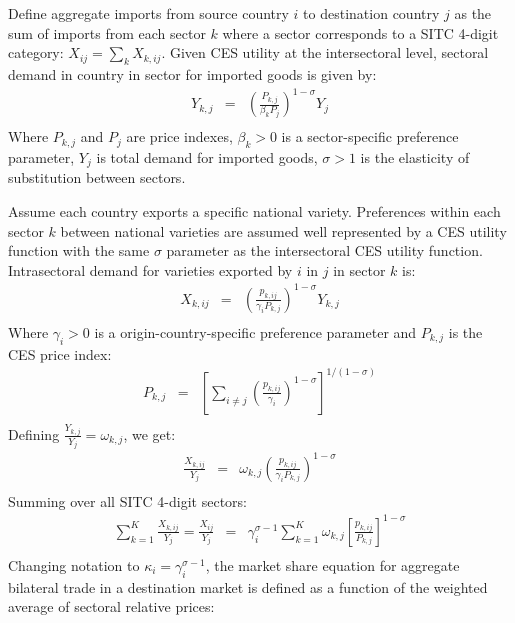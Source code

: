 \documentclass[12pt,twoside,a4paper,notitlepage]{article}
\begin{document}
Define aggregate imports from source country $i$ to destination country $j$  as the sum of imports from each sector $k$ where a sector corresponds to a SITC 4-digit category: ${{X}_{ij}}=\sum\limits_{k}{{{X}_{k,ij}}}$.
Given CES utility at the intersectoral level, sectoral demand in country  in sector  for imported goods is given by: 
\[\begin{array}{*{35}{l}}
   {{Y}_{k,j}} & = & {{\left( \frac{{{P}_{k,j}}}{{{\beta }_{k}}{{P}_{j}}} \right)}^{1-\sigma }}{{Y}_{j}}  \\
\end{array}\]
Where ${{P}_{k,j}}$ and ${{P}_{j}}$ are price indexes, ${{\beta }_{k}}>0$ is a sector-specific preference parameter, ${{Y}_{j}}$ is total demand for imported goods, $\sigma >1$ is the elasticity of substitution between sectors.

 Assume each country exports a specific national variety.
Preferences within each sector $k$ between national varieties are assumed well represented by a CES utility function with the same $\sigma $ parameter as the intersectoral CES utility function.
Intrasectoral demand for varieties exported by $i$ in $j$ in sector $k$ is: 
\[\begin{array}{*{35}{l}}
   {{X}_{k,ij}} & = & {{\left( \frac{{{p}_{k,ij}}}{{{\gamma }_{i}}{{P}_{k,j}}} \right)}^{1-\sigma }}{{Y}_{k,j}}  \\
\end{array}\]
Where ${{\gamma }_{i}}>0$ is a origin-country-specific preference parameter and ${{P}_{k,j}}$ is the CES price index:
\[\begin{array}{*{35}{l}}
   {{P}_{k,j}} & = & {{\left[ \sum\limits_{i\ne j}{{{\left( \frac{{{p}_{k,ij}}}{{{\gamma }_{i}}} \right)}^{1-\sigma }}} \right]}^{1/(1-\sigma )}}  \\
\end{array}\]
  Defining $\frac{{{Y}_{k,j}}}{{{Y}_{j}}}={{\omega }_{k,j}}$, we get: 
\[\begin{array}{*{35}{l}}
   \frac{{{X}_{k,ij}}}{{{Y}_{j}}} & = & {{\omega }_{k,j}}{{\left( \frac{{{p}_{k,ij}}}{{{\gamma }_{i}}{{P}_{k,j}}} \right)}^{1-\sigma }}  \\
\end{array}\]
 Summing over all SITC 4-digit sectors: 
\[\begin{array}{*{35}{l}}
   \sum\limits_{k=1}^{K}{\frac{{{X}_{k,ij}}}{{{Y}_{j}}}}=\frac{{{X}_{ij}}}{{{Y}_{j}}} & = & \gamma _{i}^{\sigma -1}\sum\limits_{k=1}^{K}{{{\omega }_{k,j}}}{{\left[ \frac{{{p}_{k,ij}}}{{{P}_{k,j}}} \right]}^{1-\sigma }}  \\
\end{array}\]
Changing notation to $\kappa_i=\gamma_i^{\sigma-1}$, the market share equation for aggregate bilateral trade in a destination market is defined as a function of the weighted average of sectoral relative prices: 
\end{document}
